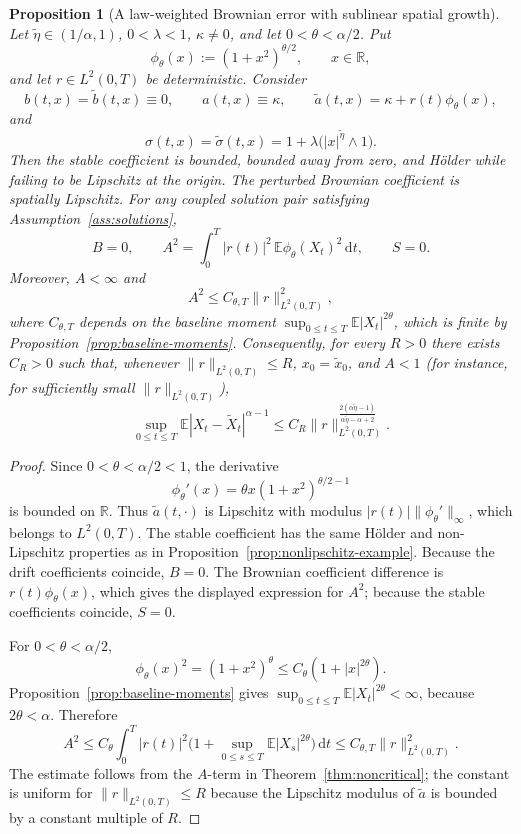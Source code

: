 \documentclass[11pt]{article}
\newtheorem{proposition}[theorem]{Proposition}
\newcommand{\R}{\mathbb{R}}
\newcommand{\E}{\mathbb{E}}
\newcommand{\1}{\mathbf{1}}
\newcommand{\dd}{\,\mathrm{d}}
\newcommand{\wt}{\tilde}
\begin{document}
\begin{proposition}[A law-weighted Brownian error with sublinear spatial growth]\label{prop:mixed-tail-brownian-error}
Let $\wt\eta\in(1/\alpha,1)$, $0<\lambda<1$, $\kappa\ne0$, and let $0<\theta<\alpha/2$. Put
\[
  \phi_\theta(x):=(1+x^2)^{\theta/2},\qquad x\in\R,
\]
and let $r\in L^2(0,T)$ be deterministic. Consider
\[
  b(t,x)=\wt b(t,x)\equiv0,
  \qquad
  a(t,x)\equiv\kappa,
  \qquad
  \wt a(t,x)=\kappa+r(t)\phi_\theta(x),
\]
and
\[
  \sigma(t,x)=\wt\sigma(t,x)=1+\lambda\bigl(|x|^{\wt\eta}\wedge1\bigr).
\]
Then the stable coefficient is bounded, bounded away from zero, and H\"older while failing to be Lipschitz at the origin. The perturbed Brownian coefficient is spatially Lipschitz. For any coupled solution pair satisfying Assumption~\ref{ass:solutions},
\[
  B=0,
  \qquad
  A^2=\int_0^T |r(t)|^2\,\E \phi_\theta(X_t)^2\dd t,
  \qquad
  S=0.
\]
Moreover, $A<\infty$ and
\[
  A^2\le C_{\theta,T}\|r\|_{L^2(0,T)}^2,
\]
where $C_{\theta,T}$ depends on the baseline moment $\sup_{0\le t\le T}\E|X_t|^{2\theta}$, which is finite by Proposition~\ref{prop:baseline-moments}. Consequently, for every $R>0$ there exists $C_R>0$ such that, whenever $\|r\|_{L^2(0,T)}\le R$, $x_0=\wt x_0$, and $A<1$ (for instance, for sufficiently small $\|r\|_{L^2(0,T)}$),
\[
  \sup_{0\le t\le T}\E|X_t-\wt X_t|^{\alpha-1}
  \le C_R\|r\|_{L^2(0,T)}^{\frac{2(\alpha\wt\eta-1)}{\alpha\wt\eta-\alpha+2}}.
\]
\end{proposition}

\begin{proof}
Since $0<\theta<\alpha/2<1$, the derivative
\[
  \phi_\theta'(x)=\theta x(1+x^2)^{\theta/2-1}
\]
is bounded on $\R$. Thus $\wt a(t,\cdot)$ is Lipschitz with modulus $|r(t)|\|\phi_\theta'\|_\infty$, which belongs to $L^2(0,T)$. The stable coefficient has the same H\"older and non-Lipschitz properties as in Proposition~\ref{prop:nonlipschitz-example}. Because the drift coefficients coincide, $B=0$. The Brownian coefficient difference is $r(t)\phi_\theta(x)$, which gives the displayed expression for $A^2$; because the stable coefficients coincide, $S=0$.

For $0<\theta<\alpha/2$,
\[
  \phi_\theta(x)^2=(1+x^2)^\theta\le C_\theta(1+|x|^{2\theta}).
\]
Proposition~\ref{prop:baseline-moments} gives $\sup_{0\le t\le T}\E|X_t|^{2\theta}<\infty$, because $2\theta<\alpha$. Therefore
\[
  A^2\le C_\theta\int_0^T |r(t)|^2\bigl(1+\sup_{0\le s\le T}\E|X_s|^{2\theta}\bigr)\dd t
  \le C_{\theta,T}\|r\|_{L^2(0,T)}^2.
\]
The estimate follows from the $A$-term in Theorem~\ref{thm:noncritical}; the constant is uniform for $\|r\|_{L^2(0,T)}\le R$ because the Lipschitz modulus of $\wt a$ is bounded by a constant multiple of $R$.
\end{proof}
\end{document}
